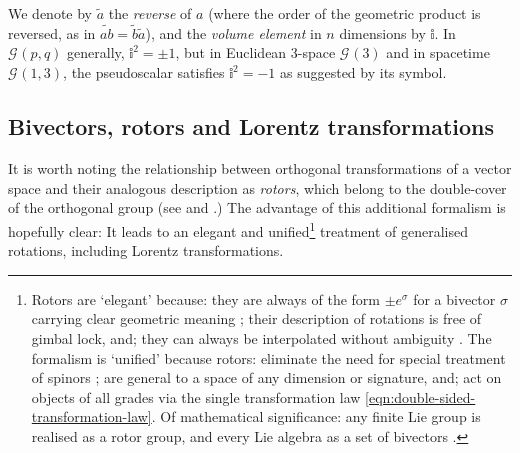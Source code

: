 \documentclass[12pt,a4paper]{article}
\newcommand{\GA}[1][]{\mathcal{G}_{#1}}
\newcommand{\vol}{\mathbb{i}}
\newcommand{\rev}[1]{\widetilde{#1}}
\begin{document}
We denote by $\rev{a}$ the \emph{reverse} of $a$ (where the order of the geometric product is reversed, as in $\rev{ab} = \rev{b}\rev{a}$), and the \emph{volume element} in $n$ dimensions by $\vol$.
In $\GA(p, q)$ generally, $\vol^2 = \pm 1$, but in Euclidean 3-space $\GA(3)$ and in spacetime $\GA(1,3)$, the pseudoscalar satisfies $\vol^2 = -1$ as suggested by its symbol.




\subsection{Bivectors, rotors and Lorentz transformations}

It is worth noting the relationship between orthogonal transformations of a vector space and their analogous description as \emph{rotors}, which belong to the double-cover of the orthogonal group (see \cite[\textsection{}\,11.3]{doran2003ga} and \cite{lasenby2016ga-unified-language,hestenes1986ga-unified-language}.)
The advantage of this additional formalism is hopefully clear: It leads to an elegant and unified\footnote{
	Rotors are `elegant' because: they are always of the form $\pm e^\sigma{}$ for a bivector $\sigma{}$ carrying clear geometric meaning \cite[\textsection{}\,11.3]{doran2003ga}; their description of rotations is free of gimbal lock, and; they can always be interpolated without ambiguity \cite{lasenby2011ga-practical}.
	The formalism is `unified' because rotors: eliminate the need for special treatment of spinors \cite{hestenes1986ga-unified-language}; are general to a space of any dimension or signature, and; act on objects of all grades via the single transformation law \eqref{eqn:double-sided-transformation-law}.
	Of mathematical significance: any finite Lie group is realised as a rotor group, and every Lie algebra as a set of bivectors \cite{lie-groups-as-spin-groups}.
} treatment of generalised rotations, including Lorentz transformations.
\end{document}
